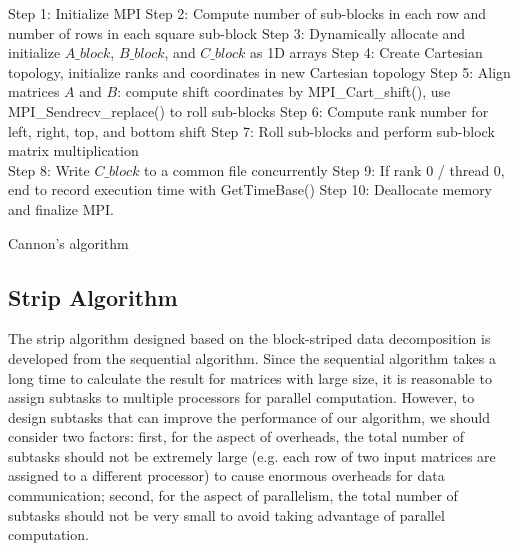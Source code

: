 \documentclass[conference]{IEEEtran}
\begin{document}
\begin{algorithm}
\SetAlgoLined
{}
 \Begin
  {Step 1: Initialize MPI\;
   Step 2: Compute number of sub-blocks in each row and number of rows in each square sub-block\;
   Step 3: Dynamically allocate and initialize $A\_block$, $B\_block$, and $C\_block$ as 1D arrays\;
   Step 4: Create Cartesian topology, initialize ranks and coordinates in new Cartesian topology\;
   Step 5: Align matrices $A$ and $B$: compute shift coordinates by MPI\_Cart\_shift(), use MPI\_Sendrecv\_replace() to roll sub-blocks\; 
   Step 6: Compute rank number for left, right, top, and bottom shift\;
   Step 7: Roll sub-blocks and perform sub-block matrix multiplication\\
    Step 8: Write $C\_block$ to a common file concurrently\;
    Step 9: If rank 0 / thread 0, end to record execution time with GetTimeBase()\;
    Step 10: Deallocate memory and finalize MPI.
  }
 \caption{Cannon's algorithm}
 \label{alg:cannon}
\end{algorithm}



\subsection{Strip Algorithm}

The strip algorithm designed based on the block-striped data decomposition is developed from the sequential algorithm. Since the sequential algorithm takes a long time to calculate the result for matrices with large size, it is reasonable to assign subtasks to multiple processors for parallel computation. However, to design subtasks that can improve the performance of our algorithm, we should consider two factors: first, for the aspect of overheads, the total number of subtasks should not be extremely large (e.g. each row of two input matrices are assigned to a different processor) to cause enormous overheads for data communication; second, for the aspect of parallelism, the total number of subtasks should not be very small to avoid taking advantage of parallel computation. 
\end{document}
